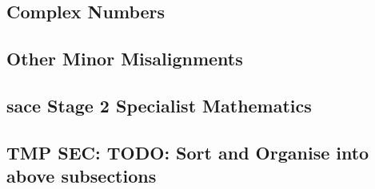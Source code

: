 \documentclass[twoside,12pt,a4paper]{report}
\begin{document}
\subsection{Complex Numbers}

\subsection{Other Minor Misalignments}

\subsection{\gls{sace} Stage 2 Specialist Mathematics}

\subsection{TMP SEC: TODO: Sort and Organise into above subsections}
\end{document}
